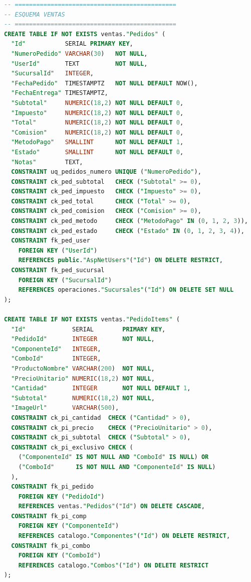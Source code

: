 \begin{lstlisting}[language=SQL, caption={DDL desplegado: esquema ventas (Pedidos, PedidoItems y CarritosAbandonados)}, label=lst:ddl-ventas]
-- =============================================
-- ESQUEMA VENTAS
-- =============================================
CREATE TABLE IF NOT EXISTS ventas."Pedidos" (
  "Id"           SERIAL PRIMARY KEY,
  "NumeroPedido" VARCHAR(30)   NOT NULL,
  "UserId"       TEXT          NOT NULL,
  "SucursalId"   INTEGER,
  "FechaPedido"  TIMESTAMPTZ   NOT NULL DEFAULT NOW(),
  "FechaEntrega" TIMESTAMPTZ,
  "Subtotal"     NUMERIC(18,2) NOT NULL DEFAULT 0,
  "Impuesto"     NUMERIC(18,2) NOT NULL DEFAULT 0,
  "Total"        NUMERIC(18,2) NOT NULL DEFAULT 0,
  "Comision"     NUMERIC(18,2) NOT NULL DEFAULT 0,
  "MetodoPago"   SMALLINT      NOT NULL DEFAULT 1,
  "Estado"       SMALLINT      NOT NULL DEFAULT 0,
  "Notas"        TEXT,
  CONSTRAINT uq_pedidos_numero UNIQUE ("NumeroPedido"),
  CONSTRAINT ck_ped_subtotal   CHECK ("Subtotal" >= 0),
  CONSTRAINT ck_ped_impuesto   CHECK ("Impuesto" >= 0),
  CONSTRAINT ck_ped_total      CHECK ("Total" >= 0),
  CONSTRAINT ck_ped_comision   CHECK ("Comision" >= 0),
  CONSTRAINT ck_ped_metodo     CHECK ("MetodoPago" IN (0, 1, 2, 3)),
  CONSTRAINT ck_ped_estado     CHECK ("Estado" IN (0, 1, 2, 3, 4)),
  CONSTRAINT fk_ped_user
    FOREIGN KEY ("UserId")
    REFERENCES public."AspNetUsers"("Id") ON DELETE RESTRICT,
  CONSTRAINT fk_ped_sucursal
    FOREIGN KEY ("SucursalId")
    REFERENCES operaciones."Sucursales"("Id") ON DELETE SET NULL
);

CREATE TABLE IF NOT EXISTS ventas."PedidoItems" (
  "Id"             SERIAL        PRIMARY KEY,
  "PedidoId"       INTEGER       NOT NULL,
  "ComponenteId"   INTEGER,
  "ComboId"        INTEGER,
  "ProductoNombre" VARCHAR(200)  NOT NULL,
  "PrecioUnitario" NUMERIC(18,2) NOT NULL,
  "Cantidad"       INTEGER       NOT NULL DEFAULT 1,
  "Subtotal"       NUMERIC(18,2) NOT NULL,
  "ImageUrl"       VARCHAR(500),
  CONSTRAINT ck_pi_cantidad  CHECK ("Cantidad" > 0),
  CONSTRAINT ck_pi_precio    CHECK ("PrecioUnitario" > 0),
  CONSTRAINT ck_pi_subtotal  CHECK ("Subtotal" > 0),
  CONSTRAINT ck_pi_exclusivo CHECK (
    ("ComponenteId" IS NOT NULL AND "ComboId" IS NULL) OR
    ("ComboId"      IS NOT NULL AND "ComponenteId" IS NULL)
  ),
  CONSTRAINT fk_pi_pedido
    FOREIGN KEY ("PedidoId")
    REFERENCES ventas."Pedidos"("Id") ON DELETE CASCADE,
  CONSTRAINT fk_pi_comp
    FOREIGN KEY ("ComponenteId")
    REFERENCES catalogo."Componentes"("Id") ON DELETE RESTRICT,
  CONSTRAINT fk_pi_combo
    FOREIGN KEY ("ComboId")
    REFERENCES catalogo."Combos"("Id") ON DELETE RESTRICT
);


\end{lstlisting}
